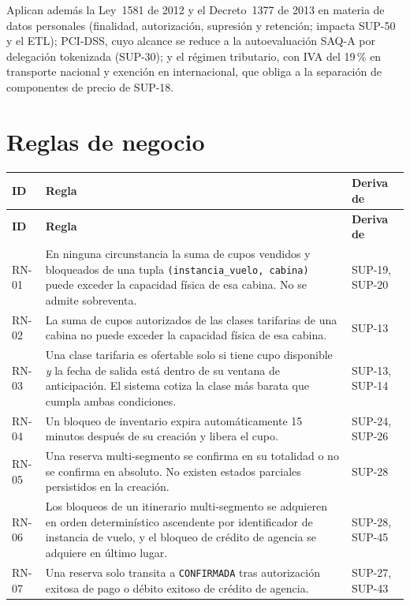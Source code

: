 \documentclass[10pt,letterpaper]{article}
\begin{document}
Aplican además la Ley~1581 de 2012 y el Decreto~1377 de 2013 en materia de datos personales (finalidad, autorización, supresión y retención; impacta SUP-50 y el ETL); PCI-DSS, cuyo alcance se reduce a la autoevaluación SAQ-A por delegación tokenizada (SUP-30); y el régimen tributario, con IVA del 19\,\% en transporte nacional y exención en internacional, que obliga a la separación de componentes de precio de SUP-18.

\section{Reglas de negocio}
\label{sec:reglas}
\begin{longtable}{@{}L{1.6cm} L{11.2cm} L{2.4cm}@{}}
\toprule
\textbf{ID} & \textbf{Regla} & \textbf{Deriva de} \\
\midrule
\endfirsthead
\toprule
\textbf{ID} & \textbf{Regla} & \textbf{Deriva de} \\
\midrule
\endhead
RN-01 & En ninguna circunstancia la suma de cupos vendidos y bloqueados de una tupla \texttt{(instancia\_vuelo, cabina)} puede exceder la capacidad física de esa cabina. No se admite sobreventa. & SUP-19, SUP-20 \\
RN-02 & La suma de cupos autorizados de las clases tarifarias de una cabina no puede exceder la capacidad física de esa cabina. & SUP-13 \\
RN-03 & Una clase tarifaria es ofertable solo si tiene cupo disponible \emph{y} la fecha de salida está dentro de su ventana de anticipación. El sistema cotiza la clase más barata que cumpla ambas condiciones. & SUP-13, SUP-14 \\
RN-04 & Un bloqueo de inventario expira automáticamente 15 minutos después de su creación y libera el cupo. & SUP-24, SUP-26 \\
RN-05 & Una reserva multi-segmento se confirma en su totalidad o no se confirma en absoluto. No existen estados parciales persistidos en la creación. & SUP-28 \\
RN-06 & Los bloqueos de un itinerario multi-segmento se adquieren en orden determinístico ascendente por identificador de instancia de vuelo, y el bloqueo de crédito de agencia se adquiere en último lugar. & SUP-28, SUP-45 \\
RN-07 & Una reserva solo transita a \texttt{CONFIRMADA} tras autorización exitosa de pago o débito exitoso de crédito de agencia. & SUP-27, SUP-43 \\

\end{longtable}
\end{document}
